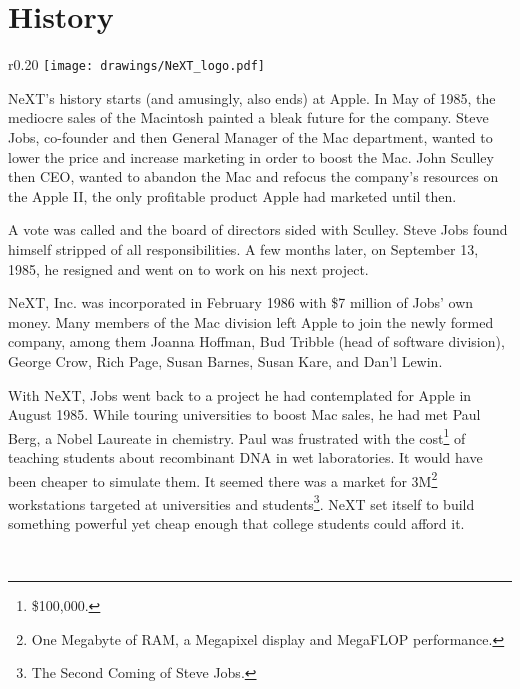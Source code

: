 \section{History}

\begin{wrapfigure}[8]{r}{0.20\textwidth}
\centering
\texttt{[image: drawings/NeXT\_logo.pdf]}
\end{wrapfigure}
\par
NeXT's history starts (and amusingly, also ends) at Apple. In May of 1985, the mediocre sales of the Macintosh painted a bleak future for the company. Steve Jobs, co-founder and then General Manager of the Mac department, wanted to lower the price and increase marketing in order to boost the Mac. John Sculley then CEO, wanted to abandon the Mac and refocus the company's resources on the Apple II, the only profitable product Apple had marketed until then.\\
\par
 A vote was called and the board of directors sided with Sculley. Steve Jobs found himself stripped of all responsibilities. A few months later, on September 13, 1985, he resigned and went on to work on his next project.\\
\par
NeXT, Inc. was incorporated in February 1986 with \$7 million of Jobs' own money. Many members of the Mac division left Apple to join the newly formed company, among them  Joanna Hoffman, Bud Tribble (head of software division), George Crow, Rich Page, Susan Barnes, Susan Kare, and Dan'l Lewin.\\ 
\par
With NeXT, Jobs went back to a project he had contemplated for Apple in August 1985. While touring universities to boost Mac sales, he had met Paul Berg, a Nobel Laureate in chemistry. Paul was frustrated with the cost\footnote{\$100,000.} of teaching students about recombinant DNA in wet laboratories. It would have been cheaper to simulate them. It seemed there was a market for 3M\footnote{One Megabyte of RAM, a Megapixel display and MegaFLOP performance.} workstations targeted at universities and students\footnote{The Second Coming of Steve Jobs.}. NeXT set itself to build something powerful yet cheap enough that college students could afford it.\\
\par
{}\\
\par
